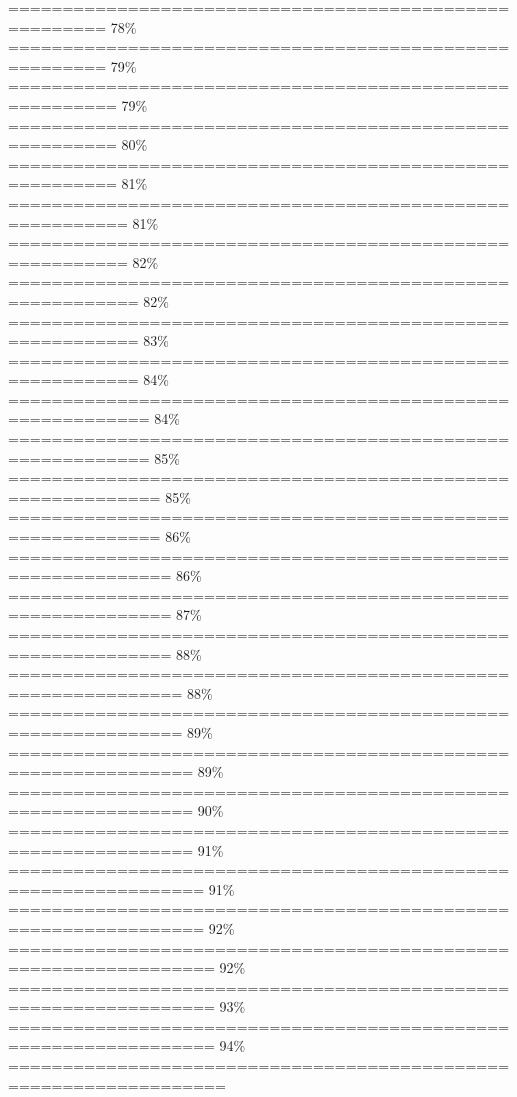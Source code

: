 \documentclass[
]{article}
\begin{document}
\textbar=======================================================
\textbar{} 78\% \textbar{}
\textbar=======================================================
\textbar{} 79\% \textbar{}
\textbar========================================================
\textbar{} 79\% \textbar{}
\textbar========================================================
\textbar{} 80\% \textbar{}
\textbar========================================================
\textbar{} 81\% \textbar{}
\textbar=========================================================
\textbar{} 81\% \textbar{}
\textbar=========================================================
\textbar{} 82\% \textbar{}
\textbar==========================================================
\textbar{} 82\% \textbar{}
\textbar==========================================================
\textbar{} 83\% \textbar{}
\textbar==========================================================
\textbar{} 84\% \textbar{}
\textbar===========================================================
\textbar{} 84\% \textbar{}
\textbar===========================================================
\textbar{} 85\% \textbar{}
\textbar============================================================
\textbar{} 85\% \textbar{}
\textbar============================================================
\textbar{} 86\% \textbar{}
\textbar=============================================================
\textbar{} 86\% \textbar{}
\textbar=============================================================
\textbar{} 87\% \textbar{}
\textbar=============================================================
\textbar{} 88\% \textbar{}
\textbar==============================================================
\textbar{} 88\% \textbar{}
\textbar==============================================================
\textbar{} 89\% \textbar{}
\textbar===============================================================
\textbar{} 89\% \textbar{}
\textbar===============================================================
\textbar{} 90\% \textbar{}
\textbar===============================================================
\textbar{} 91\% \textbar{}
\textbar================================================================
\textbar{} 91\% \textbar{}
\textbar================================================================
\textbar{} 92\% \textbar{}
\textbar=================================================================
\textbar{} 92\% \textbar{}
\textbar=================================================================
\textbar{} 93\% \textbar{}
\textbar=================================================================
\textbar{} 94\% \textbar{}
\textbar==================================================================
\end{document}

